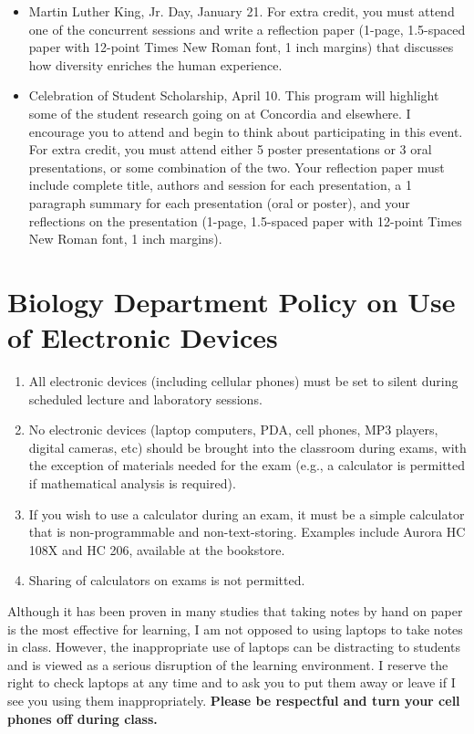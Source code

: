 \documentclass{tufte-handout}
\begin{document}
\begin{fullwidth}
\begin{itemize}
\item Martin Luther King, Jr. Day, January 21. For extra credit, you must attend one of the concurrent sessions and write a reflection paper (1-page, 1.5-spaced paper with 12-point Times New Roman font, 1 inch margins) that discusses how diversity enriches the human experience. 
\item Celebration of Student Scholarship, April 10.  This program will highlight some of the student research going on at Concordia and elsewhere.  I encourage you to attend and begin to think about participating in this event. For extra credit, you must attend either 5 poster presentations or 3 oral presentations, or some combination of the two.  Your reflection paper must include complete title, authors and session for each presentation, a 1 paragraph summary for each presentation (oral or poster), and your reflections on the presentation (1-page, 1.5-spaced paper with 12-point Times New Roman font, 1 inch margins).  	
\end{itemize}

\section{Biology Department Policy on Use of Electronic Devices}

\begin{enumerate}
\item All electronic devices (including cellular phones) must be set to silent during scheduled lecture and laboratory sessions.
\item No electronic devices (laptop computers, PDA, cell phones, MP3 players, digital cameras, etc) should be brought into the classroom during exams, with the exception of materials needed for the exam (e.g., a calculator is permitted if mathematical analysis is required).
\item If you wish to use a calculator during an exam, it must be a simple calculator that is non-programmable and non-text-storing. Examples include Aurora HC 108X and HC 206, available at the bookstore. 
\item Sharing of calculators on exams is not permitted.
\end{enumerate}

Although it has been proven in many studies that taking notes by hand on paper is the most effective for learning, I am not opposed to using laptops to take notes in class. However, the inappropriate use of laptops can be distracting to students and is viewed as a serious disruption of the learning environment. I reserve the right to check laptops at any time and to ask you to put them away or leave if I see you using them inappropriately. \textbf{Please be respectful and turn your cell phones off during class.}		








\end{fullwidth}
\end{document}
